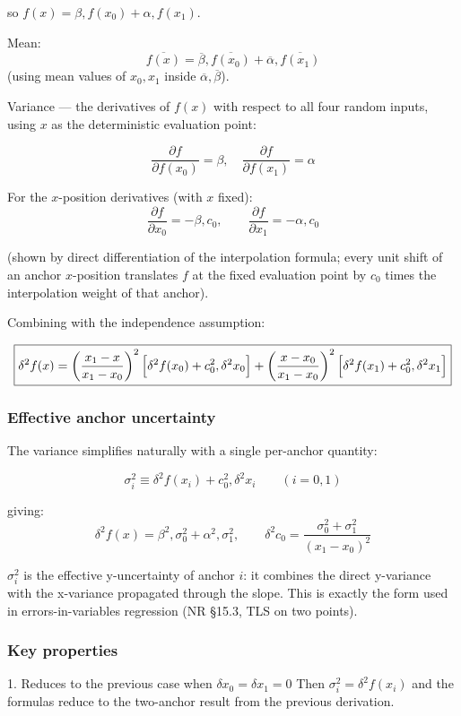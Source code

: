 \documentclass[twoside]{article}
\numberwithin{equation}{section}
\begin{document}
so $f(x) = \beta, f(x_0) + \alpha, f(x_1)$.

Mean:
$$\overline{f(x)} = \overline{\beta}, \overline{f(x_0)} + \overline{\alpha}, \overline{f(x_1)}$$
(using mean values of $x_0, x_1$ inside $\overline{\alpha}, \overline{\beta}$).

Variance — the derivatives of $f(x)$ with respect to all four random inputs, using $x$ as the deterministic evaluation point:

$$\frac{\partial f}{\partial f(x_0)} = \beta, \quad \frac{\partial f}{\partial f(x_1)} = \alpha$$

For the $x$-position derivatives (with $x$ fixed):
$$\frac{\partial f}{\partial x_0} = -\beta, c_0, \qquad \frac{\partial f}{\partial x_1} = -\alpha, c_0$$

(shown by direct differentiation of the interpolation formula; every unit shift of an anchor $x$-position translates $f$ at the fixed evaluation point by $c_0$ times the interpolation weight of that anchor).

Combining with the independence assumption:

$$\boxed{\delta^2 f(x) = \left(\frac{x_1 - x}{x_1 - x_0}\right)^2 \Bigl[\delta^2 f(x_0) + c_0^2, \delta^2 x_0\Bigr] + \left(\frac{x - x_0}{x_1 - x_0}\right)^2 \Bigl[\delta^2 f(x_1) + c_0^2, \delta^2 x_1\Bigr]}$$

\subsubsection{Effective anchor uncertainty}
The variance simplifies naturally with a single per-anchor quantity:

$$\sigma_i^2 \equiv \delta^2 f(x_i) + c_0^2, \delta^2 x_i \qquad (i = 0, 1)$$

giving:
$$\delta^2 f(x) = \beta^2, \sigma_0^2 + \alpha^2, \sigma_1^2, \qquad \delta^2 c_0 = \frac{\sigma_0^2 + \sigma_1^2}{(x_1 - x_0)^2}$$

$\sigma_i^2$ is the effective y-uncertainty of anchor $i$: it combines the direct y-variance with the x-variance propagated through the slope. This is exactly the form used in errors-in-variables regression (NR §15.3, TLS on two points).

\subsubsection{Key properties}
1. Reduces to the previous case when $\delta x_0 = \delta x_1 = 0$
Then $\sigma_i^2 = \delta^2 f(x_i)$ and the formulas reduce to the two-anchor result from the previous derivation.
\end{document}
